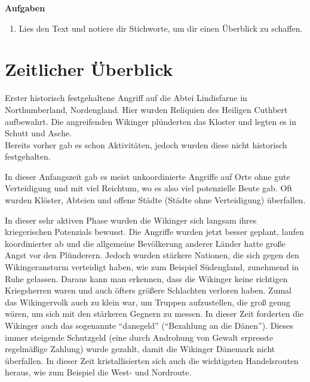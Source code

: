 \documentclass[12pt,a4paper,ngerman,openany]{book}
\newcommand{\aufgaben}[1]{
  \begin{tcolorbox}
    \textbf{Aufgaben}
    \begin{enumerate}
      #1
    \end{enumerate}
  \end{tcolorbox}
} %
\begin{document}
\aufgaben {
  \item Lies den Text und notiere dir Stichworte, um dir einen Überblick zu schaffen.
}

\pagebreak

\section{Zeitlicher Überblick}

\begin{tcolorbox}[sharp corners, title=08. Juni 793]
Erster historisch festgehaltene Angriff auf die Abtei Lindisfarne in Northumberland, Nordengland. Hier wurden Reliquien des Heiligen Cuthbert aufbewahrt. Die angreifenden Wikinger plünderten das Kloster und legten es in Schutt und Asche.\\
Bereits vorher gab es schon Aktivitäten, jedoch wurden diese nicht historisch festgehalten.
\end{tcolorbox}

\begin{tcolorbox}[sharp corners, title=Ungefähr 800 bis 850]
In dieser Anfangszeit gab es meist unkoordinierte Angriffe auf Orte ohne gute Verteidigung und mit viel Reichtum, wo es also viel potenzielle Beute gab. Oft wurden Klöster, Abteien und offene Städte (Städte ohne Verteidigung) überfallen.
\end{tcolorbox}

\begin{tcolorbox}[sharp corners, title=Ungefähr 850 bis 900]
In dieser sehr aktiven Phase wurden die Wikinger sich langsam ihres kriegerischen Potenzials bewusst. Die Angriffe wurden jetzt besser geplant, laufen koordinierter ab und die allgemeine Bevölkerung anderer Länder hatte große Angst vor den Plünderern.
Jedoch wurden stärkere Nationen, die sich gegen den Wikingeransturm verteidigt haben, wie zum Beispiel Südengland, zunehmend in Ruhe gelassen. Daraus kann man erkennen, dass die Wikinger keine richtigen Kriegsherren waren und auch öfters größere Schlachten verloren haben. Zumal das Wikingervolk auch zu klein war, um Truppen aufzustellen, die groß genug wären, um sich mit den stärkeren Gegnern zu messen.
In dieser Zeit forderten die Wikinger auch das sogenannte “danegeld” (“Bezahlung an die Dänen”). Dieses immer steigende Schutzgeld (eine durch Androhung von Gewalt erpresste regelmäßige Zahlung) wurde gezahlt, damit die Wikinger Dänemark nicht überfallen.
In dieser Zeit kristallisierten sich auch die wichtigsten Handelsrouten heraus, wie zum Beispiel die West- und Nordroute.
\end{tcolorbox}
\end{document}
